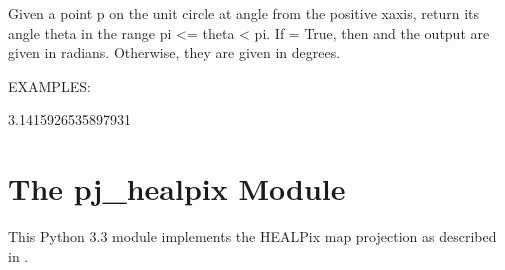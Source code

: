 \documentclass[a4paper,12ptopenany,oneside,english]{sphinxmanual}
\begin{document}
\begin{fulllineitems}
\label{\detokenize{utils:rhealpixdggs.utils.wrap_longitude}}
\pysigstartsignatures
{}
\pysigstopsignatures
\sphinxAtStartPar
Given a point p on the unit circle at angle  from the positive
x\sphinxhyphen{}axis, return its angle theta in the range \sphinxhyphen{}pi \textless{}= theta \textless{} pi.
If  = True, then  and the output are given in radians.
Otherwise, they are given in degrees.

\sphinxAtStartPar
EXAMPLES:

\begin{sphinxVerbatim}[commandchars=\\\{\}]
   
\end{sphinxVerbatim}
\begin{description}
\sphinxAtStartPar
\sphinxhyphen{}3.1415926535897931

\begin{sphinxVerbatim}[commandchars=\\\{\}]
 
 
 
\end{sphinxVerbatim}

\end{description}

\end{fulllineitems}


\sphinxstepscope


\chapter{The pj\_healpix Module}
\label{\detokenize{pj_healpix:module-rhealpixdggs.pj_healpix}}\label{\detokenize{pj_healpix:the-pj-healpix-module}}\label{\detokenize{pj_healpix::doc}}
\sphinxAtStartPar
This Python 3.3 module implements the HEALPix map projection as described in .
\end{document}
